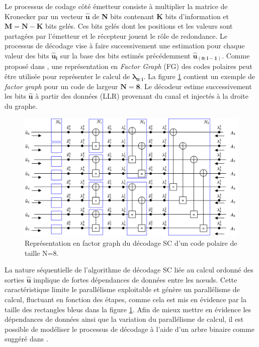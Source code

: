 \documentclass[../main.tex]{subfiles}
\begin{document}
Le processus de codage côté émetteur consiste à multiplier la matrice de Kronecker \cite{Arikan08} par un vecteur $\bm{ \hat{u} }$ de \textbf{N} bits contenant \textbf{K} bits d’information et $\bm{M=N-K}$ bits gelés. Ces bits gelés dont les positions et les valeurs sont partagées par l’émetteur et le récepteur jouent le rôle de redondance. Le processus de décodage vise à faire successivement une estimation pour chaque valeur des bits $\bm{\hat{u}_i}$ sur la base des bits estimés précédemment $\bm{ \hat{u}_{ (0:i-1) }}$. Comme proposé dans \cite{Arikan_2009}, une représentation en \textit{Factor Graph} (FG) des codes polaires peut être utilisée pour représenter le calcul de $\bm{ \lambda_{0:i}}$. La figure \ref{XXPC} contient un exemple de \textit{factor graph} pour un code de largeur $\bm{N=8}$. Le décodeur estime successivement les bits $\bm{\hat{u}}$ à partir des données (LLR) provenant du canal et injectés à la droite du graphe.
\begin{figure}
    \centering
    \includegraphics[scale=0.3]{chapter2/figs/XXPC.png}
    \caption{Représentation en factor graph du décodage SC d’un code polaire de taille N=8.}
    \label{XXPC}
\end{figure}
La nature séquentielle de l’algorithme de décodage SC liée au calcul ordonné des sorties $\bm{\hat{u}}$ implique de fortes dépendances de données entre les nœuds. Cette caractéristique limite le parallélisme exploitable et génère un parallélisme de calcul, fluctuant en fonction des étapes, comme cela est mis en évidence par la taille des rectangles bleus dans la figure \ref{XXPC}. Afin de mieux mettre en évidence les dépendances de données ainsi que la variation du parallélisme de calcul, il est possible de modéliser le processus de décodage à l’aide d’un arbre binaire comme suggéré dans \cite{91}.
\end{document}
